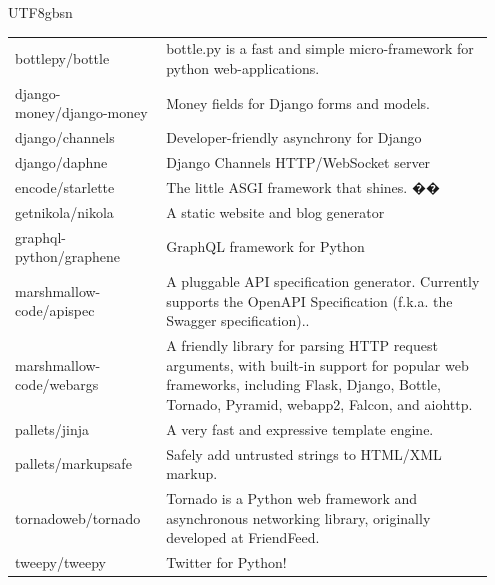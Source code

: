 \begin{CJK*}{UTF8}{gbsn}
\begin{longtable}{p{0.3\linewidth} | p{0.65\linewidth}}
bottlepy/bottle & bottle.py is a fast and simple micro-framework for python web-applications. \\
django-money/django-money & Money fields for Django forms and models. \\
django/channels & Developer-friendly asynchrony for Django \\
django/daphne & Django Channels HTTP/WebSocket server \\
encode/starlette & The little ASGI framework that shines. �� \\
getnikola/nikola & A static website and blog generator \\
graphql-python/graphene & GraphQL framework for Python \\
marshmallow-code/apispec & A pluggable API specification generator. Currently supports the OpenAPI Specification (f.k.a. the Swagger specification).. \\
marshmallow-code/webargs & A friendly library for parsing HTTP request arguments, with built-in support for popular web frameworks, including Flask, Django, Bottle, Tornado, Pyramid, webapp2, Falcon, and aiohttp. \\
pallets/jinja & A very fast and expressive template engine. \\
pallets/markupsafe & Safely add untrusted strings to HTML/XML markup. \\
tornadoweb/tornado & Tornado is a Python web framework and asynchronous networking library, originally developed at FriendFeed. \\
tweepy/tweepy & Twitter for Python! \\
\end{longtable}
\end{CJK*}
\label{tab:summary_of_repos}
